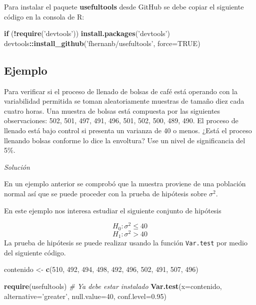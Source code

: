 \documentclass[10pt,]{krantz}
\makeatletter
\newenvironment{Shaded}{\begin{snugshade}}{\end{snugshade}}
\newcommand{\KeywordTok}[1]{\textcolor[rgb]{0.13,0.29,0.53}{\textbf{#1}}}
\newcommand{\DataTypeTok}[1]{\textcolor[rgb]{0.13,0.29,0.53}{#1}}
\newcommand{\DecValTok}[1]{\textcolor[rgb]{0.00,0.00,0.81}{#1}}
\newcommand{\FloatTok}[1]{\textcolor[rgb]{0.00,0.00,0.81}{#1}}
\newcommand{\StringTok}[1]{\textcolor[rgb]{0.31,0.60,0.02}{#1}}
\newcommand{\CommentTok}[1]{\textcolor[rgb]{0.56,0.35,0.01}{\textit{#1}}}
\newcommand{\OtherTok}[1]{\textcolor[rgb]{0.56,0.35,0.01}{#1}}
\newcommand{\ControlFlowTok}[1]{\textcolor[rgb]{0.13,0.29,0.53}{\textbf{#1}}}
\newcommand{\OperatorTok}[1]{\textcolor[rgb]{0.81,0.36,0.00}{\textbf{#1}}}
\newcommand{\NormalTok}[1]{#1}
\newenvironment{kframe}{%
\medskip{}
\setlength{\fboxsep}{.8em}
 \def\at@end@of@kframe{}%
 \ifinner\ifhmode%
  \def\at@end@of@kframe{\end{minipage}}%
  \begin{minipage}{\columnwidth}%
 \fi\fi%
 \def\FrameCommand##1{\hskip\@totalleftmargin \hskip-\fboxsep
 \colorbox{shadecolor}{##1}\hskip-\fboxsep
     \hskip-\linewidth \hskip-\@totalleftmargin \hskip\columnwidth}%
 \MakeFramed {\advance\hsize-\width
   \@totalleftmargin\z@ \linewidth\hsize
   \@setminipage}}%
 {\par\unskip\endMakeFramed%
 \at@end@of@kframe}
\renewenvironment{Shaded}{\begin{kframe}}{\end{kframe}}
\makeatother
\begin{document}
Para instalar el paquete \textbf{usefultools} desde GitHub se debe
copiar el siguiente código en la consola de R:

\begin{Shaded}
\begin{Highlighting}[]
\ControlFlowTok{if}\NormalTok{ (}\OperatorTok{!}\KeywordTok{require}\NormalTok{(}\StringTok{'devtools'}\NormalTok{)) }\KeywordTok{install.packages}\NormalTok{(}\StringTok{'devtools'}\NormalTok{)}
\NormalTok{devtools}\OperatorTok{::}\KeywordTok{install_github}\NormalTok{(}\StringTok{'fhernanb/usefultools'}\NormalTok{, }\DataTypeTok{force=}\OtherTok{TRUE}\NormalTok{)}
\end{Highlighting}
\end{Shaded}

\subsection*{Ejemplo}\label{ejemplo-68}


Para verificar si el proceso de llenado de bolsas de café está operando
con la variabilidad permitida se toman aleatoriamente muestras de tamaño
diez cada cuatro horas. Una muestra de bolsas está compuesta por las
siguientes observaciones: 502, 501, 497, 491, 496, 501, 502, 500, 489,
490. El proceso de llenado está bajo control si presenta un varianza de
40 o menos. ¿Está el proceso llenando bolsas conforme lo dice la
envoltura? Use un nivel de significancia del 5\%.

\emph{Solución}

En un ejemplo anterior se comprobó que la muestra proviene de una
población normal así que se puede proceder con la prueba de hipótesis
sobre \(\sigma^2\).

En este ejemplo nos interesa estudiar el siguiente conjunto de hipótesis

\[H_0: \sigma^2 \leq 40\] \[H_1: \sigma^2 > 40\] La prueba de hipótesis
se puede realizar usando la función \texttt{Var.test} por medio del
siguiente código.

\begin{Shaded}
\begin{Highlighting}[]
\NormalTok{contenido <-}\StringTok{ }\KeywordTok{c}\NormalTok{(}\DecValTok{510}\NormalTok{, }\DecValTok{492}\NormalTok{, }\DecValTok{494}\NormalTok{, }\DecValTok{498}\NormalTok{, }\DecValTok{492}\NormalTok{,}
               \DecValTok{496}\NormalTok{, }\DecValTok{502}\NormalTok{, }\DecValTok{491}\NormalTok{, }\DecValTok{507}\NormalTok{, }\DecValTok{496}\NormalTok{)}

\KeywordTok{require}\NormalTok{(usefultools)  }\CommentTok{# Ya debe estar instalado}
\KeywordTok{Var.test}\NormalTok{(}\DataTypeTok{x=}\NormalTok{contenido, }\DataTypeTok{alternative=}\StringTok{'greater'}\NormalTok{,}
         \DataTypeTok{null.value=}\DecValTok{40}\NormalTok{, }\DataTypeTok{conf.level=}\FloatTok{0.95}\NormalTok{)}
\end{Highlighting}
\end{Shaded}
\end{document}
